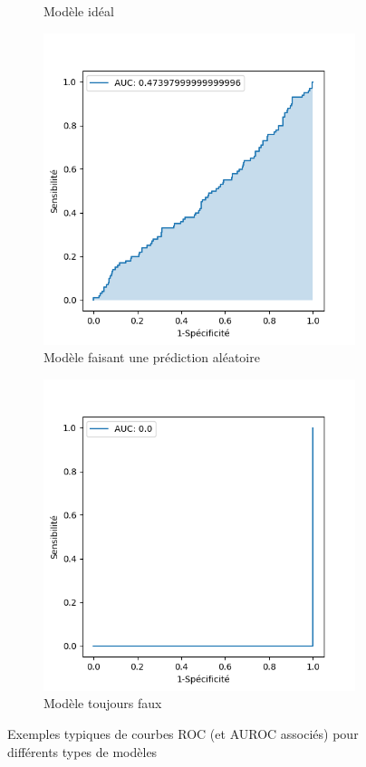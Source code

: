 \begin{figure}[!h]
\begin{subfigure}{.49\textwidth}
		\caption{Modèle idéal}
	\end{subfigure}
	\begin{subfigure}{.49\textwidth}
		\includegraphics[width=\textwidth]{gnuplot/revue_litterature/AUC/random_AUC}
		\caption{Modèle faisant une prédiction aléatoire}
	\end{subfigure}
	\begin{subfigure}{.49\textwidth}
		\includegraphics[width=\textwidth]{gnuplot/revue_litterature/AUC/worst_AUC}
		\caption{Modèle toujours faux}
		\label{fig:AUROC_alwaysWrong}
	\end{subfigure}
\caption{Exemples typiques de courbes ROC (et AUROC associés) pour différents types de modèles}
\label{fig:AUROC_Curves}
\end{figure}


